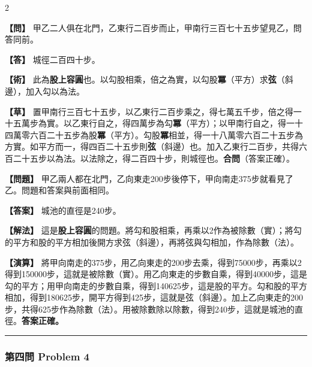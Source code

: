 \documentclass[11pt,a4paper]{article}
\newcommand{\wen}[1]{\par\noindent\textbf{\color{problemcolor}【問】} #1\par}
\newcommand{\da}[1]{\par\noindent\textbf{\color{problemcolor}【答】} #1\par}
\newcommand{\shu}[1]{\par\noindent\textbf{\color{problemcolor}【術】} #1\par}
\newcommand{\cao}[1]{\par\noindent\textbf{\color{problemcolor}【草】} #1\par}
\newcommand{\wenm}[1]{\par\noindent\textbf{\color{problemcolor}【問題】} #1\par}
\newcommand{\dam}[1]{\par\noindent\textbf{\color{problemcolor}【答案】} #1\par}
\newcommand{\shum}[1]{\par\noindent\textbf{\color{problemcolor}【解法】} #1\par}
\newcommand{\caom}[1]{\par\noindent\textbf{\color{problemcolor}【演算】} #1\par}
\begin{document}
\begin{paracol}{2}
\wen{甲乙二人俱在北門，乙東行二百步而止，甲南行三百七十五步望見乙，問答同前。}

\da{城徑二百四十步。}

\shu{此為\textbf{股上容圓}也。以勾股相乘，倍之為實，以勾股\textbf{冪}（平方）求\textbf{弦}（斜邊），加入勾以為法。}

\cao{置甲南行三百七十五步，以乙東行二百步乘之，得七萬五千步，倍之得一十五萬步為實。以乙東行自之，得四萬步為勾\textbf{冪}（平方）；以甲南行自之，得一十四萬零六百二十五步為股\textbf{冪}（平方）。勾股\textbf{冪}相並，得一十八萬零六百二十五步為方實。如平方而一，得四百二十五步則\textbf{弦}（斜邊）也。加入乙東行二百步，共得六百二十五步以為法。以法除之，得二百四十步，則城徑也。\textbf{合問}（答案正確）。}

\switchcolumn
\wenm{甲乙兩人都在北門，乙向東走200步後停下，甲向南走375步就看見了乙。問題和答案與前面相同。}

\dam{城池的直徑是240步。}

\shum{這是\textbf{股上容圓}的問題。將勾和股相乘，再乘以2作為被除數（實）；將勾的平方和股的平方相加後開方求弦（斜邊），再將弦與勾相加，作為除數（法）。}

\caom{將甲向南走的375步，用乙向東走的200步去乘，得到75000步，再乘以2得到150000步，這就是被除數（實）。用乙向東走的步數自乘，得到40000步，這是勾的平方；用甲向南走的步數自乘，得到140625步，這是股的平方。勾和股的平方相加，得到180625步，開平方得到425步，這就是弦（斜邊）。加上乙向東走的200步，共得625步作為除數（法）。用被除數除以除數，得到240步，這就是城池的直徑。\textbf{答案正確。}}
\end{paracol}

\vspace{0.5cm}
\noindent\textcolor{rulecolor}{\rule{\textwidth}{0.4pt}}

\subsubsection*{第四問 \quad Problem 4}
\end{document}
